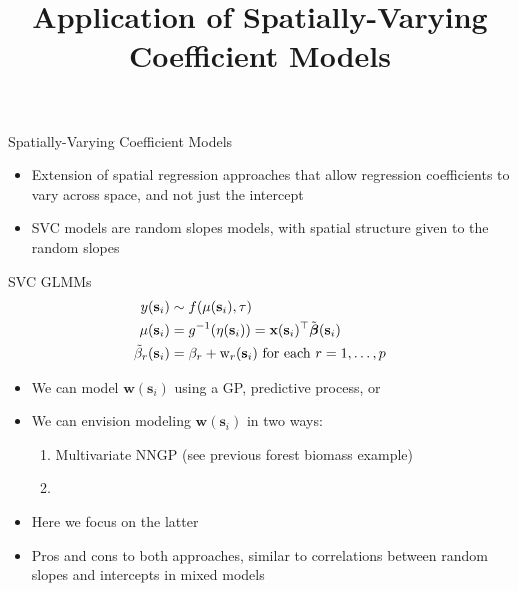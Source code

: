 



\title[]{Application of Spatially-Varying Coefficient Models}




\maketitle

\begin{frame}{Spatially-Varying Coefficient Models}
     \begin{itemize}
          \item Extension of spatial regression approaches that allow regression coefficients to vary across space, and not just the intercept
	  \item SVC models are random slopes models, with spatial structure given to the random slopes
     \end{itemize}
\end{frame}


\begin{frame}{SVC GLMMs}
    \begin{align*}
	    y(\textbf{s}_i) &\sim f(\mu(\textbf{s}_i), \tau) \\
	    \mu(\textbf{s}_i) &= g^{-1}(\eta(\textbf{s}_i)) = \textbf{x}(\textbf{s}_i)^\top \tilde{\mbox{\boldmath $ \beta $}}(\textbf{s}_i) \\
	    \tilde{\beta}_r(\textbf{s}_i) &= \beta_r + \text{w}_r(\textbf{s}_i) \text{ for each } r = 1, \dots, p
    \end{align*}
    \begin{itemize}
        \item We can model $\textbf{w}(\bm{s}_i)$ using a GP, predictive process, or 
        \item We can envision modeling $\textbf{w}(\bm{s}_i)$ in two ways: 
        \begin{enumerate}
		\item Multivariate NNGP (see previous forest biomass example) 
		\item {}
        \end{enumerate}
	\item Here we focus on the latter
        \item Pros and cons to both approaches, similar to correlations between random slopes and intercepts in mixed models
    \end{itemize}
\end{frame}

